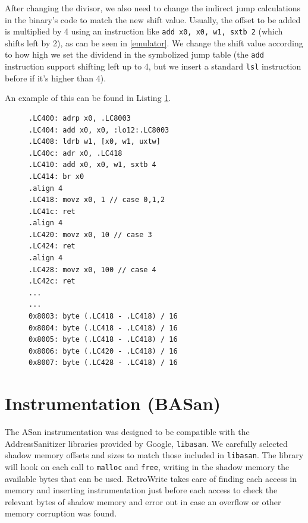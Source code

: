 \documentclass[a4paper,11pt,oneside]{report}
\newcommand{\sysname}{RetroWrite\xspace}
\begin{document}
After changing the divisor, we also need to change the indirect jump calculations in the
binary's code to match the new shift value. Usually, the offset to be added is multiplied by
4 using an instruction like \texttt{add x0, x0, w1, sxtb 2} (which shifts left by 2), as
can be seen in \autoref{emulator}. We change the shift value according to how high we set
the dividend in the symbolized jump table (the \texttt{add} instruction support shifting left
up to 4, but we insert a standard \texttt{lsl} instruction before if it's higher than 4). 

An example of this can be found in Listing \ref{enlarged}.

\begin{figure}[h]
\begin{lstlisting}[basicstyle=\ttfamily\small,numbers=none]
.LC400: adrp x0, .LC8003
.LC404: add x0, x0, :lo12:.LC8003
.LC408: ldrb w1, [x0, w1, uxtw]
.LC40c: adr x0, .LC418
.LC410: add x0, x0, w1, sxtb 4
.LC414: br x0
.align 4
.LC418: movz x0, 1 // case 0,1,2
.LC41c: ret
.align 4
.LC420: movz x0, 10 // case 3
.LC424: ret
.align 4
.LC428: movz x0, 100 // case 4
.LC42c: ret
...
...
0x8003: byte (.LC418 - .LC418) / 16
0x8004: byte (.LC418 - .LC418) / 16
0x8005: byte (.LC418 - .LC418) / 16
0x8006: byte (.LC420 - .LC418) / 16
0x8007: byte (.LC428 - .LC418) / 16
\end{lstlisting}
\label{enlarged}
\end{figure}


\section{Instrumentation (BASan)}
The ASan instrumentation was designed to be compatible with the 
AddressSanitizer libraries provided by Google, \texttt{libasan}. We carefully 
selected shadow memory offsets and sizes to match those included in 
\texttt{libasan}.  The library will hook on each call to \texttt{malloc} and 
\texttt{free}, writing in the shadow memory the available bytes that can be 
used. \sysname takes care of finding each access in memory and inserting 
instrumentation just before each access to check the relevant bytes of shadow 
memory and error out in case an overflow or other memory corruption was found.
\end{document}
